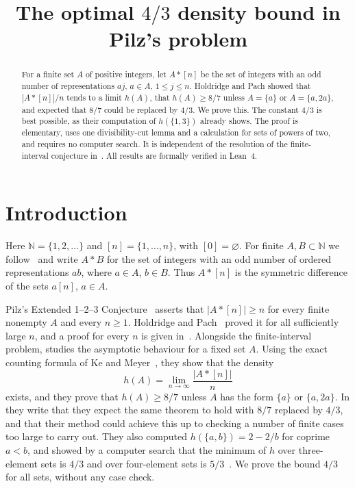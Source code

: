\documentclass[11pt]{article}
\title{The optimal \(4/3\) density bound in Pilz's problem}
\author{}
\date{}
\newcommand{\N}{\mathbb N}
\begin{document}
\maketitle
\begin{abstract}
For a finite set \(A\) of positive integers, let \(A*[n]\) be the set of
integers with an odd number of representations \(aj\), \(a\in A\),
\(1\le j\le n\). Holdridge and Pach showed that \(|A*[n]|/n\) tends to a
limit \(h(A)\), that \(h(A)\ge8/7\) unless \(A=\{a\}\) or \(A=\{a,2a\}\),
and expected that \(8/7\) could be replaced by \(4/3\). We prove this.
The constant \(4/3\) is best possible, as their computation of
\(h(\{1,3\})\) already shows. The proof is elementary, uses one
divisibility-cut lemma and a calculation for sets of powers of two, and
requires no computer search. It is independent of the resolution of the
finite-interval conjecture in~\cite{Main}. All results are formally
verified in Lean~4.
\end{abstract}

\section*{Introduction}
Here \(\N=\{1,2,\ldots\}\) and \([n]=\{1,\ldots,n\}\), with \([0]=\varnothing\).
For finite \(A,B\subset\N\) we follow~\cite{HP} and write \(A*B\) for the
set of integers with an odd number of ordered representations \(ab\), where
\(a\in A\), \(b\in B\). Thus \(A*[n]\) is the symmetric difference of the
sets \(a[n]\), \(a\in A\).

Pilz's Extended 1--2--3 Conjecture~\cite{Pilz,HKP} asserts that
\(|A*[n]|\ge n\) for every finite nonempty \(A\) and every \(n\ge1\).
Holdridge and Pach~\cite{HP} proved it for all sufficiently large \(n\), and
a proof for every \(n\) is given in~\cite{Main}. Alongside the
finite-interval problem, \cite{HP} studies the asymptotic behaviour for a
fixed set \(A\). Using the exact counting formula of Ke and
Meyer~\cite[(2.1)]{KM}, they show \cite[Lemma 1.6]{HP} that the density
\[
h(A)=\lim_{n\to\infty}\frac{|A*[n]|}{n}
\]
exists, and they prove \cite[Theorem 1.8]{HP} that \(h(A)\ge8/7\) unless
\(A\) has the form \(\{a\}\) or \(\{a,2a\}\). In \cite[Remark 1.9]{HP} they
write that they expect the same theorem to hold with \(8/7\) replaced by
\(4/3\), and that their method could achieve this up to checking a number
of finite cases too large to carry out. They also computed
\(h(\{a,b\})=2-2/b\) for coprime \(a<b\), and showed by a computer search
that the minimum of \(h\) over three-element sets is \(4/3\) and over
four-element sets is \(5/3\)~\cite[Lemma 5.6]{HP}. We prove the bound
\(4/3\) for all sets, without any case check.
\end{document}
